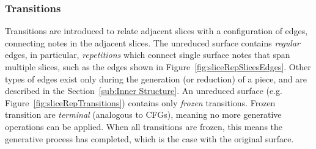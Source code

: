 \documentclass[12pt,a4paper,twoside,openany]{report} \usepackage[pdfborder={0 0 0}]{hyperref}    %
\theoremstyle{definition} \newtheorem{definition}{Definition}[section]
\begin{document}
\subsubsection{Transitions}
\label{sub:transitions}
Transitions are introduced to relate adjacent slices with a configuration of edges, connecting notes in the adjacent
slices. 
The unreduced surface contains \textit{regular} edges, in particular, \textit{repetitions} which connect single surface notes that span multiple slices, such as the edges shown in Figure~\ref{fig:sliceRepSlicesEdges}. 
Other types of edges exist only during the generation (or reduction) of a piece, and are described in the Section~\ref{sub:Inner Structure}. 
An unreduced surface (e.g. Figure~\ref{fig:sliceRepTransitions}) contains only \textit{frozen} transitions.
Frozen transition are \textit{terminal} (analogous to CFGs), meaning no more generative operations can be applied.
When all transitions are frozen, this means the generative process has completed, which is the case with the
original surface.
\end{document}
